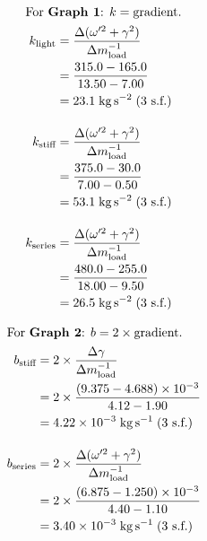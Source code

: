 \begin{strip}
\vspace{-4em}
\begin{multicols}{2}
\noindent
\begin{align*}
\intertext{For $\textbf{Graph 1}$: $k = \text{gradient}$.}
k_{\text{light}} &= \frac{\Delta (\omega'^2 + \gamma^2)}{\Delta m_{\text{load}}^{-1}} \\
&= \frac{315.0 - 165.0}{13.50 - 7.00} \\
&= 23.1 \; \si{\kilo\gram\per\second\squared} \; \text{(3 s.f.)} \\[1em]
k_{\text{stiff}} &= \frac{\Delta (\omega'^2 + \gamma^2)}{\Delta m_{\text{load}}^{-1}} \\
&= \frac{375.0 - 30.0}{7.00 - 0.50} \\
&= 53.1 \; \si{\kilo\gram\per\second\squared} \; \text{(3 s.f.)} \\[1em]
k_{\text{series}} &= \frac{\Delta (\omega'^2 + \gamma^2)}{\Delta m_{\text{load}}^{-1}} \\
&= \frac{480.0 - 255.0}{18.00 - 9.50} \\
&= 26.5 \; \si{\kilo\gram\per\second\squared} \; \text{(3 s.f.)}
\end{align*}

\columnbreak

\noindent
\begin{align*}
\intertext{For $\textbf{Graph 2}$: $b = 2 \times \text{gradient}$.}
b_{\text{stiff}} &= 2 \times \frac{\Delta \gamma}{\Delta m_{\text{load}}^{-1}} \\
&= 2 \times \frac{\left(9.375 - 4.688 \right) \times 10^{-3}}{4.12 - 1.90} \\
&= 4.22 \times 10^{-3} \; \si{\kilo\gram\per\second} \; \text{(3 s.f.)} \\[1em]
b_{\text{series}} &= 2 \times \frac{\Delta (\omega'^2 + \gamma^2)}{\Delta m_{\text{load}}^{-1}} \\
&= 2 \times \frac{\left(6.875 - 1.250 \right) \times 10^{-3}}{4.40 - 1.10} \\
&= 3.40 \times 10^{-3} \; \si{\kilo\gram\per\second} \; \text{(3 s.f.)}
\end{align*}
\end{multicols}
\end{strip}
\nopagebreak